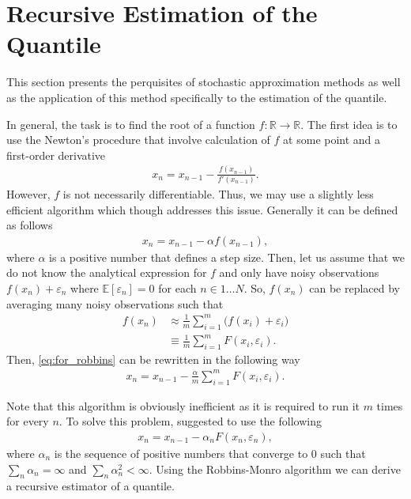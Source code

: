 \documentclass[12pt]{article}
\begin{document}
	\section{Recursive Estimation of the Quantile}
	
	This section presents the perquisites of stochastic approximation methods as well as the application of this method specifically to the estimation of the quantile.
	
	In general, the task is to find the root of a function $ f: \mathbb{R} \rightarrow \mathbb{R} $. The first idea is to use the Newton's procedure that involve calculation of $ f $ at some point and a first-order derivative
	\begin{align}
		x_{n} = x_{n-1} - \frac{f(x_{n-1})}{f'(x_{n-1})}.
	\end{align}
	However, $ f $ is not necessarily differentiable. Thus, we may use a slightly less efficient algorithm which though addresses this issue. Generally it can be defined as follows
	\begin{align}
		x_n = x_{n-1} - \alpha f(x_{n-1}), \label{eq:for_robbins}
	\end{align}
	where $ \alpha $ is a positive number that defines a step size. Then, let us assume that we do not know the analytical expression for $ f $ and only have noisy observations $ f(x_n) + \varepsilon_n $ where $ \mathbb{E}[\varepsilon_n] = 0 $ for each $ n \in 1\dots N $. So, $ f(x_n) $ can be replaced by averaging many noisy observations such that
	\begin{align}
		f(x_n) &\approx \frac{1}{m} \sum_{i=1}^{m} \big(f(x_i)+\varepsilon_i\big) \\
		&\equiv \frac{1}{m} \sum_{i=1}^{m} F(x_i, \varepsilon_i).
	\end{align}
	Then, \eqref{eq:for_robbins} can be rewritten in the following way
	\begin{align}
		x_{n} = x_{n-1} - \frac{\alpha}{m}\sum_{i=1}^{m}F(x_i, \varepsilon_i).
	\end{align}
	
	Note that this algorithm is obviously inefficient as it is required to run it $ m $ times for every $ n $. To solve this problem, \textcite{Robbins1951} suggested to use the following
	\begin{align}
		x_n = x_{n-1} - \alpha_n F(x_n, \varepsilon_n), 
	\end{align}
	where $ \alpha_n $ is the sequence of positive numbers that converge to 0 such that $ \sum_n\alpha_n = \infty $ and $ \sum_n\alpha_n^2 < \infty $. Using the Robbins-Monro algorithm we can derive a recursive estimator of a quantile. 
	
\end{document}
